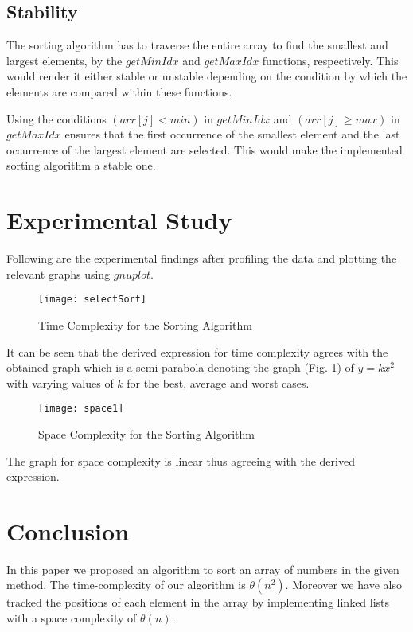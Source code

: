 \documentclass[letterpaper, 11 pt, conference]{ieeeconf}  %
\begin{document}
\subsection{Stability}
The sorting algorithm has to traverse the entire array to find the smallest and largest elements, by the $getMinIdx$ and $getMaxIdx$ functions, respectively. This would render it either stable or unstable depending on the condition by which the elements are compared within these functions.

Using the conditions $(arr[j] < min)$ in $getMinIdx$ and $(arr[j] \geq max)$ in $getMaxIdx$ ensures that the first occurrence of the smallest element and the last occurrence of the largest element are selected. This would make the implemented sorting algorithm a stable one. \\ 

\section{Experimental Study}
Following are the experimental findings after profiling the data and plotting the relevant graphs using $gnuplot$.

\begin{figure}[H]
\texttt{[image: selectSort]}
\caption{Time Complexity for the Sorting Algorithm}
\end{figure}

It can be seen that the derived expression for time complexity agrees with the obtained graph which is a semi-parabola denoting the graph (Fig. 1) of $y = kx^2$ with varying values of $k$ for the best, average and worst cases.

\begin{figure}[H]
\texttt{[image: space1]}
\caption{Space Complexity for the Sorting Algorithm}
\end{figure}

The graph for space complexity is linear thus agreeing with the derived expression. \\ 


\section{Conclusion}

In this paper we proposed an algorithm to sort an array of numbers in the given method. The time-complexity of our algorithm is $\theta (n^2)$. Moreover we have also tracked the positions of each element in the array by implementing linked lists with a space complexity of $\theta (n)$.
\end{document}
